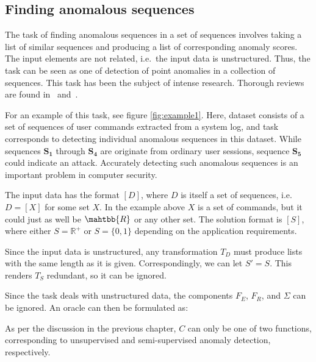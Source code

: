 \subsection{Finding anomalous sequences}

The task of finding anomalous sequences in a set of sequences involves taking a list of similar sequences and producing a list of corresponding anomaly scores. The input elements are not related, i.e.\ the input data is unstructured. Thus, the task can be seen as one of detection of point anomalies in a collection of sequences. This task has been the subject of intense research. Thorough reviews are found in~\cite{chandola2} and~\cite{chandola3}.

For an example of this task, see figure \ref{fig:example1}. Here, dataset consists of a set of sequences of user commands extracted from a system log, and task corresponds to detecting individual anomalous sequences in this dataset. While sequences $\mathbf{S_1}$ through $\mathbf{S_4}$ are originate from ordinary user sessions, sequence $\mathbf{S_5}$ could indicate an attack. Accurately detecting such anomalous sequences is an important problem in computer security.

The input data has the format $[D]$, where $D$ is itself a set of sequences, i.e.\ $D = [X]$ for some set $X$. In the example above $X$ is a set of commands, but it could just as well be $\mahtbb{R}$ or any other set. The solution format is $[S]$, where either $S = \mathbb{R}^+$ or $S = \{0, 1\}$ depending on the application requirements.

Since the input data is unstructured, any transformation $T_D$ must produce lists with the same length as it is given. Correspondingly, we can let $S' = S$. This renders $T_S$ redundant, so it can be ignored.

Since the task deals with unstructured data, the components $F_E$, $F_R$, and $\Sigma$ can be ignored. An oracle can then be formulated as:

\begin{algorithmic}
     
    \EndFor{}
\end{algorithmic}

As per the discussion in the previous chapter, $C$ can only be one of two functions, corresponding to unsupervised and semi-supervised anomaly detection, respectively.

